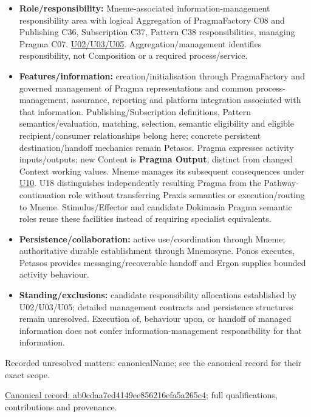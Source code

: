 \begin{itemize}


\item \textbf{Role/responsibility:} Mneme-associated information-management responsibility
  area with logical Aggregation of PragmaFactory C08 and Publishing C36,
  Subscription C37, Pattern C38 responsibilities, managing Pragma C07.
  \href{\detokenize{../../../../../docs/markdown/05-information-systems-architecture/sources.md#u05}}{U02/U03/U05}. Aggregation/management identifies responsibility,
  not Composition or a required process/service.

\item \textbf{Features/information:} creation/initialisation through PragmaFactory and
  governed management of Pragma representations and common process-management,
  assurance, reporting and platform integration associated with that information.
  Publishing/Subscription definitions, Pattern semantics/evaluation, matching,
  selection, semantic eligibility and eligible recipient/consumer relationships
  belong here; concrete persistent destination/handoff mechanics remain Petasos.
  Pragma expresses activity inputs/outputs; new Content is \textbf{Pragma Output}, distinct
  from changed Context working values. Mneme manages its subsequent consequences
  under \hyperref[element:27ad143e7c784e378556af8a57c438f7]{U10}.
  U18 distinguishes independently resulting Pragma from the Pathway-continuation
  role without transferring Praxis semantics or execution/routing to Mneme.
  Stimulus/Effector and candidate Dokimasia Pragma semantic roles
  reuse these facilities instead of requiring specialist equivalents.

\item \textbf{Persistence/collaboration:} active use/coordination through Mneme; authoritative
  durable establishment through Mnemosyne. Ponos executes, Petasos provides
  messaging/recoverable handoff and Ergon supplies bounded activity behaviour.

\item \textbf{Standing/exclusions:} candidate responsibility allocations established by
  U02/U03/U05;
  detailed management contracts and persistence structures remain unresolved.
  Execution of, behaviour upon, or handoff of managed information does not
  confer information-management responsibility for that information.

\end{itemize}

{\small Recorded unresolved matters: canonicalName; see the canonical record for their exact scope.}\par
{\footnotesize \href{../../../../continuum/application/application-function/ab0cdaa7ed4149ee856216efa5a265c4.md}{Canonical record: ab0cdaa7ed4149ee856216efa5a265c4}; full qualifications, contributions and provenance.}\par
